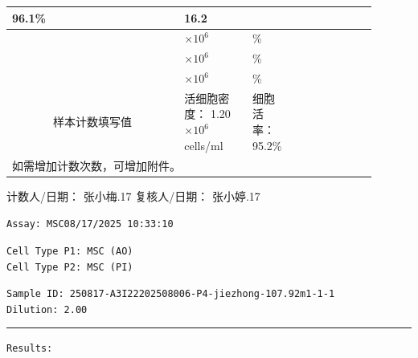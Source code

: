 \documentclass[UTF8,10pt,a4paper,fontset=fandol]{ctexart}
\newcommand{\fieldvalue}[1]{#1}
\newcommand{\handwritten}[1]{#1}
\begin{document}
\begin{tabular}{|p{0.43\linewidth}|p{0.17\linewidth}|p{0.10\linewidth}|p{0.12\linewidth}|p{0.08\linewidth}|}
\fieldvalue{\handwritten{96.1}}\%
&
\fieldvalue{\handwritten{16.2}}
&
\\
\hline
& $\times 10^{6}$ & \% & & \\
\hline
& $\times 10^{6}$ & \% & & \\
\hline
& $\times 10^{6}$ & \% & & \\
\hline
\multicolumn{1}{|c|}{样本计数填写值}
&
活细胞密度：
\fieldvalue{\handwritten{1.20}}$\times 10^{6}$ cells/ml
&
细胞活率：
\fieldvalue{\handwritten{95.2}}\%
&
&
\\
\hline
\multicolumn{5}{|l|}{如需增加计数次数，可增加附件。}\\
\hline
\end{tabular}

\bigskip

\noindent
计数人/日期：
\fieldvalue{\handwritten{张小梅.17}}
\qquad
复核人/日期：
\fieldvalue{\handwritten{张小婷.17}}


\newpage

\noindent\texttt{Assay: MSC}\hfill\texttt{08/17/2025 10:33:10}

\medskip

\noindent\texttt{Cell Type P1: MSC (AO)}\\
\texttt{Cell Type P2: MSC (PI)}

\medskip

\noindent\texttt{Sample ID: 250817-A3I22202508006-P4-jiezhong-107.92m1-1-1}\\
\texttt{Dilution: 2.00}

\noindent\rule{\linewidth}{0.4pt}

\medskip

\noindent\texttt{Results:}

\medskip
\end{document}
